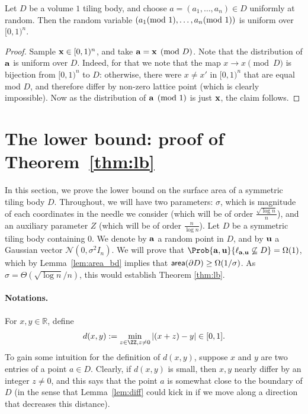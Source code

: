 \begin{lemma}\label{lem:uniform}
  Let $D$ be a volume $1$ tiling body, and choose $a=(a_1,\ldots,a_n)\in D$ uniformly
  at random. Then the random variable $(a_1\hspace{-1ex}\pmod{1},\ldots,a_n\hspace{-1ex}\pmod{1})$ is uniform over $[0,1)^n$.
\end{lemma}
\begin{proof}
  Sample ${\bf x}\in[0,1)^n$, and take ${\bf a} = {\bf x} \pmod{D}$. Note that the distribution of
  ${\bf a}$ is uniform over $D$. Indeed, for that we note that the map $x\to x\pmod{D}$ is bijection from
  $[0,1)^n$ to $D$:
  otherwise, there were $x\neq x'$ in $[0,1)^n$ that are equal mod $D$, and therefore differ by non-zero lattice point
  (which is clearly impossible). Now as the distribution of ${\bf a}\pmod{1}$ is just ${\bf x}$, the claim follows.
  \end{proof}

\section{The lower bound: proof of Theorem~\ref{thm:lb}}\label{sec:lb}

In this section, we prove the lower bound on the surface area of a
symmetric tiling body $D$.
Throughout, we will have two parameters: $\sigma$, which is magnitude of each coordinates in the needle we consider
(which will be of order $\frac{\sqrt{\log n}}{n}$), and an auxiliary parameter $Z$ (which will be of order $\frac{n}{\log n}$).
Let $D$ be a symmetric tiling body containing $0$.
We denote by ${\bf a}$ a random point in $D$,
and by ${\bf u}$ a Gaussian vector $\mathcal{N}(0,\sigma^2 I_n)$. We will prove that
$\Prob{{\bf a}, {\bf u}}{\ell_{{\bf a},{\bf u}}\not\subseteq D} = \Omega(1)$,
which by Lemma~\ref{lem:area_bd} implies that ${\sf area}(\partial D)\geq \Omega(1/\sigma)$. As
$\sigma = \Theta(\sqrt{\log n}/n)$, this would establish Theorem \ref{thm:lb}.

\paragraph{Notations.}
For $x,y\in\mathbb{R}$, define
\[
d(x,y):= \min_{z\in \ZZ, z\neq 0} |(x+z)-y|\in [0,1].
\]
To gain some intuition for the definition of $d(x,y)$, suppose $x$ and $y$ are two entries of a point $a\in D$.
Clearly, if $d(x,y)$ is small, then $x,y$ nearly differ by an integer $z\neq 0$, and this says that the point $a$ is
somewhat close to the boundary of $D$ (in the sense that Lemma~\ref{lem:diff} could kick in if we move along a direction
that decreases this distance).


